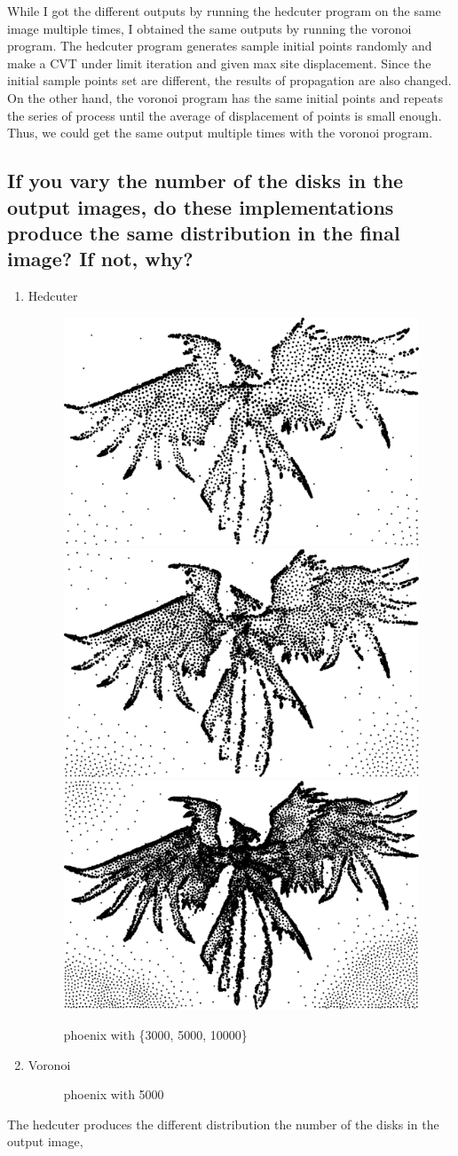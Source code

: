 \documentclass[11pt]{article}
\begin{document}
While I got the different outputs by running the hedcuter program on the same image multiple times, I obtained the same outputs by running the voronoi program. The hedcuter program generates sample initial points randomly and make a CVT under limit iteration and given max site displacement. Since the initial sample points set are different, the results of propagation are also changed. On the other hand, the voronoi program has the same initial points and repeats the series of process until the average of displacement of points is small enough. Thus, we could get the same output multiple times with the voronoi program.

\subsection{If you vary the number of the disks in the output images, do these implementations produce the same distribution in the final image? If not, why?}

\begin{enumerate}
	\item Hedcuter
	\begin{figure}[htbp]
 	 \centering
	  \includegraphics[width=.23\textwidth]{FIGS/hedcut/svg/phoenix-3000-h}
	  \includegraphics[width=.23\textwidth]{FIGS/hedcut/svg/phoenix-5000-h1}
	  \includegraphics[width=.23\textwidth]{FIGS/hedcut/svg/phoenix-10000-h}
 	 \caption{phoenix with \{3000, 5000, 10000\}}
	\end{figure}
	\item Voronoi
	\begin{figure}[htbp]
 	 \centering

 	 \caption{phoenix with 5000}
	\end{figure}
\end{enumerate}
The hedcuter produces the different distribution the number of the disks in the output image, 
\end{document}
